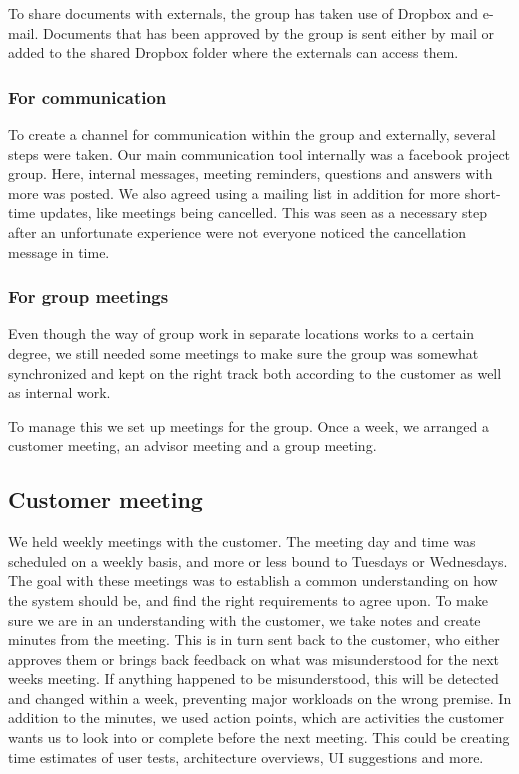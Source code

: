 \documentclass[11pt]{book}
\begin{document}
To share documents with externals, the group has taken use of Dropbox and e-mail. Documents that has been approved by the group is sent either by mail or added to the shared Dropbox folder where the externals can access them.

\subsubsection{For communication}
To create a channel for communication within the group and externally, several steps were taken. Our main communication tool internally was a facebook project group. Here, internal messages, meeting reminders, questions and answers with more was posted. We also agreed using a mailing list in addition for more short-time updates, like meetings being cancelled. This was seen as a necessary step after an unfortunate experience were not everyone noticed the cancellation message in time.

\subsubsection{For group meetings}
Even though the way of group work in separate locations works to a certain degree, we still needed some meetings to make sure the group was somewhat synchronized and kept on the right track both according to the customer as well as internal work.

To manage this we set up meetings for the group. Once a week, we arranged a customer meeting, an advisor meeting and a group meeting.

\subsection{Customer meeting}
We held weekly meetings with the customer. The meeting day and time was scheduled on a weekly basis, and more or less bound to Tuesdays or Wednesdays. The goal with these meetings was to establish a common understanding on how the system should be, and find the right requirements to agree upon. To make sure we are in an understanding with the customer, we take notes and create minutes from the meeting. This is in turn sent back to the customer, who either approves them or brings back feedback on what was misunderstood for the next weeks meeting. If anything happened to be misunderstood, this will be detected and changed within a week, preventing major workloads on the wrong premise. In addition to the minutes, we used action points, which are activities the customer wants us to look into or complete before the next meeting. This could be creating time estimates of user tests, architecture overviews, UI suggestions and more.
\end{document}
